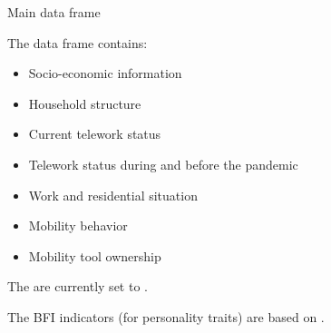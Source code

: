 \begin{Section}{Main data frame}

The  data frame contains:
\begin{itemize}

\item{} Socio-economic information
\item{} Household structure
\item{} Current telework status
\item{} Telework status during and before the pandemic
\item{} Work and residential situation
\item{} Mobility behavior
\item{} Mobility tool ownership

\end{itemize}


The  are currently set to .

The BFI indicators (for personality traits) are based on \citet{Gerlitz+Schupp:2005}.

\begin{description}


\end{description}
\end{Section}
